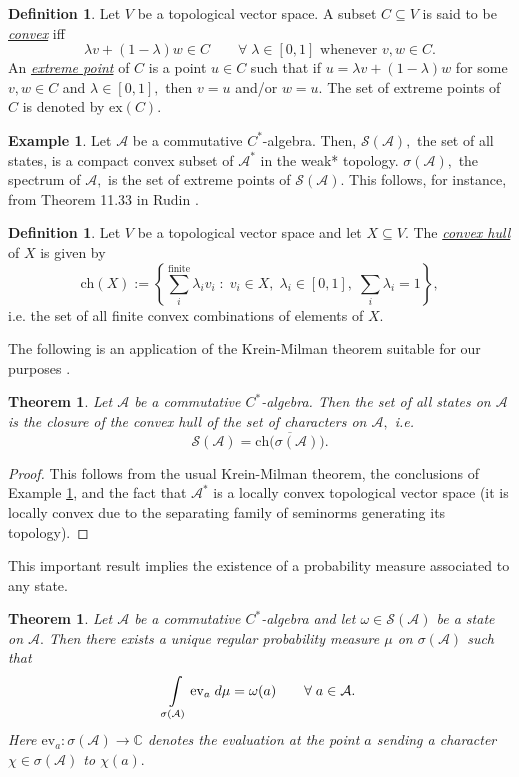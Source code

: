 \documentclass[12pt]{article}
\edef\t{\pgfmathresult}%
\theoremstyle{theorem}
\newtheorem{theorem}[equation]{Theorem}
\theoremstyle{definition}
\newtheorem{definition}[equation]{Definition}
\newtheorem{example}[equation]{Example}
\numberwithin{equation}{section}
\let\l=\lambda \let\r=\rho
\let\s=\sigma \let\t=\tau \let\u=\upsilon \let\f=\phi \let\c=\chi
\let\w=\omega      \let\G=\Gamma \let\D=\Delta \let\Q=\Theta \let\L=\Lambda
\let\C=\Chi \let\W=\Omega
\newcommand{\be}{\begin{equation}}
\newcommand{\ee}{\end{equation}}
\newcommand{\bx}{\begin{example}}
\newcommand{\ex}{\end{example}}
\newcommand{\bt}{\begin{theorem}}
\newcommand{\et}{\end{theorem}}
\newcommand{\bd}{\begin{definition}}
\newcommand{\ed}{\end{definition}}
\newcommand{\bprf}{\begin{proof}}
\newcommand{\eprf}{\end{proof}}
\newcommand{\<}{\langle}
\renewcommand{\>}{\rangle}
\def\C{{{\mathbb C}}}
\def\Q{{{\mathbb Q}}}
\def\mA{{{\mathcal{A}}}}
\def\mS{{{\mathcal{S}}}}
\begin{document}
\bd
\label{defn:convex}
Let $V$ be a topological vector space. A subset $C\subseteq V$ 
is said to be \emph{\uline{convex}} iff 
\be
\l v+(1-\l)w\in C\qquad\forall\;\l\in[0,1]\text{ whenever }v,w\in C. 
\ee
An \emph{\uline{extreme point}} of $C$ is a point $u\in C$ 
such that if $u=\l v+(1-\l)w$ for some $v,w\in C$ and $\l\in[0,1],$
then $v=u$ and/or $w=u.$ 
The set of extreme points of $C$ is denoted by $\mathrm{ex}(C).$ 
\ed

\bx
\label{ex:statesconvexspectrumextreme}
Let $\mA$ be a commutative $C^*$-algebra. 
Then, $\mS(\mA),$ the set of all states, is a compact convex
subset of $\mA^{*}$ in the weak* topology. 
$\s(\mA),$ the spectrum of $\mA,$ is the set of extreme points of $\mS(\mA).$
This follows, for instance, from Theorem 11.33 in Rudin %
\cite{Ru91}.
\ex

\bd
\label{defn:convexhull}
Let $V$ be a topological vector space and let $X\subseteq V.$ 
The \emph{\uline{convex hull}} of $X$ is given by 
\be
\mathrm{ch}(X):=\left\{\sum_{i}^{\text{finite}}\l_{i}v_{i}\;:\;v_{i}\in X,\;\l_{i}\in[0,1],\;\sum_{i}\l_{i}=1\right\}, 
\ee
i.e. the set of all finite convex combinations of elements of $X.$ 
\ed

The following is an application of the Krein-Milman theorem suitable
for our purposes \cite{Si11}. 

\bt
Let $\mA$ be a commutative $C^*$-algebra. Then the set of all states
on $\mA$ is the closure of the convex hull of the set of characters on $\mA,$ i.e.
\be
\mS(\mA)=\overline{\mathrm{ch}\big(\s(\mA)\big)}.
\ee
\et

\bprf
This follows from the usual Krein-Milman theorem, the conclusions
of Example \ref{ex:statesconvexspectrumextreme}, and the fact
that $\mA^{*}$ is a locally convex topological vector space
(it is locally convex due to the separating family of seminorms
generating its topology). 
\eprf

This important result implies the existence of a 
probability measure associated to any state. 

\bt
\label{thm:regularprobmeasonspectrumfromstate}
Let $\mA$ be a commutative $C^*$-algebra and let $\w\in\mS(\mA)$ be a
state on $\mA.$ Then there exists a unique regular probability measure 
$\mu$ on $\s(\mA)$ such that
\be
\label{eq:regularprobmeasonspectrumfromstate}
\int\displaylimits_{\s(\mA)}\mathrm{ev}_{a}\;d\mu=\w(a)\qquad\forall\;a\in\mA. 
\ee
Here $\mathrm{ev}_{a}:\s(\mA)\to\C$ denotes the evaluation at the point $a$
sending a character $\chi\in\s(\mA)$ to $\chi(a).$ 
\et
\end{document}
